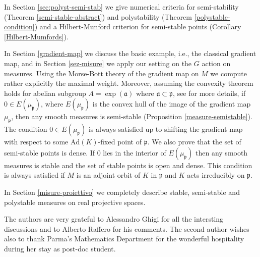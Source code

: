 \documentclass[leqno,11pt, a4]{amsart}
\theoremstyle{named}
\begin{document}
In Section \ref{sec:polyst-semi-stab} we give numerical criteria for semi-stability (Theorem \ref{semi-stable-abstract}) and polystability (Theorem \ref{polystable-condition}) and a Hilbert-Munford criterion for semi-stable points (Corollary \ref{Hilbert-Mumfords}).

In Section \ref{gradient-map} we discuss the basic example, i.e., the classical gradient map, and in Section \ref{sez-misure} we apply our setting on the $G$ action on measures.
Using the Morse-Bott theory of the gradient map on $M$ we compute rather explicitly the maximal weight. Moreover, assuming the convexity theorem holds for abelian subgroup $A=\exp({\mathfrak{a}})$ where ${\mathfrak{a}} \subset {\mathfrak{p}}$, see \cite{bghc,heinzner-schutzdeller} for more details, if $0\in E({\mu_{\mathfrak{p}}})$, where $E({\mu_{\mathfrak{p}}})$ is the convex hull of the image of the gradient map ${\mu_{\mathfrak{p}}}$, then any smooth measures is semi-stable (Proposition \ref{measure-semistable}). The condition $0\in E({\mu_{\mathfrak{p}}})$ is always satisfied up to shifting the gradient map with respect to some $\mathrm{Ad}(K)$-fixed point of ${\mathfrak{p}}$. We also prove that the set of semi-stable points is dense. If $0$ lies in the interior of $E({\mu_{\mathfrak{p}}})$ then any smooth measures is stable and the set of stable points is open and dense. This condition is always satisfied if $M$ is an adjoint orbit of $K$ in ${\mathfrak{p}}$ and $K$ acts irreducibly on ${\mathfrak{p}}$.

In Section \ref{misure-proiettivo} we completely describe stable, semi-stable and polystable measures on real projective spaces.

\noindent
{\bfseries {}}  The authors are very grateful to Alessandro Ghigi for all the intersting discussions and to Alberto Raffero for his comments. The second author wishes also to thank Parma's Mathematics Department for the wonderful hospitality during her stay as post-doc student.
\end{document}
